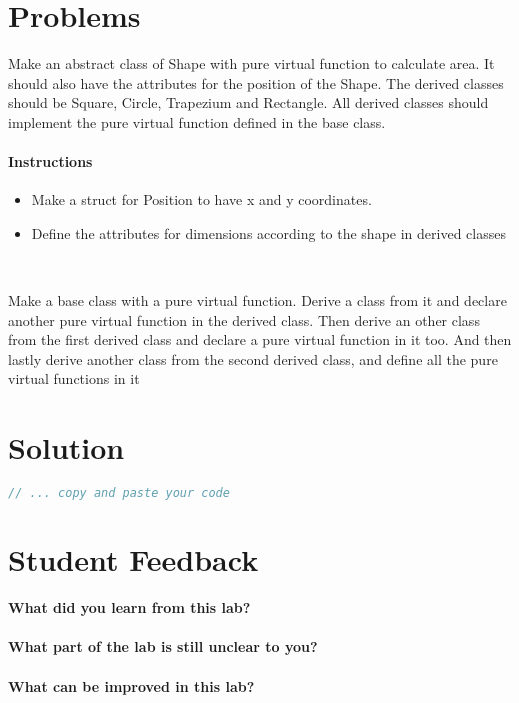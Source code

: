 \documentclass[11pt,fleqn]{book} %
\begin{document}
\section{Problems}
\begin{problem}
  Make an abstract class of Shape with pure virtual function to calculate area. It should also have the attributes for the position of the Shape. The derived classes should be Square, Circle, Trapezium and Rectangle. All derived classes should implement the pure virtual function defined in the base class. 
  \paragraph{Instructions}
  \begin{itemize}
  \item Make a struct for Position to have x and y coordinates.
  \item Define the attributes for dimensions according to the shape in derived classes
  \end{itemize}
\end{problem} ~\\
\begin{problem}
  Make a base class with a pure virtual function. Derive a class from it and declare another pure virtual function in the derived class. Then derive an other class from the first derived class and declare a pure virtual function in it too. And then lastly derive another class from the second derived class, and define all the pure virtual functions in it
\end{problem}

\newpage
\section{Solution}
\begin{lstlisting}[language=C++]
  // ... copy and paste your code
\end{lstlisting}

\newpage
\section{Student Feedback}
\textbf{What did you learn from this lab?}\\
\noindent\fbox{\parbox{\textwidth}{
  }
}\\
\textbf{What part of the lab is still unclear to you?}\\
\noindent\fbox{\parbox{\textwidth}{
  }
}\\
\textbf{What can be improved in this lab?}\\ 
\noindent\fbox{\parbox{\textwidth}{
  }
}\\
\end{document}
